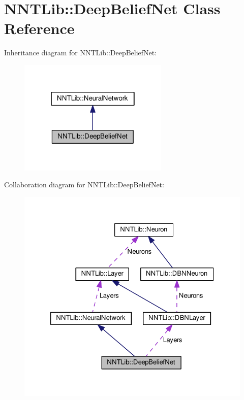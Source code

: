 \hypertarget{class_n_n_t_lib_1_1_deep_belief_net}{}\section{N\+N\+T\+Lib\+:\+:Deep\+Belief\+Net Class Reference}
\label{class_n_n_t_lib_1_1_deep_belief_net}


Inheritance diagram for N\+N\+T\+Lib\+:\+:Deep\+Belief\+Net\+:\nopagebreak
\begin{figure}[H]
\begin{center}
\leavevmode
\includegraphics[width=202pt]{class_n_n_t_lib_1_1_deep_belief_net__inherit__graph}
\end{center}
\end{figure}


Collaboration diagram for N\+N\+T\+Lib\+:\+:Deep\+Belief\+Net\+:\nopagebreak
\begin{figure}[H]
\begin{center}
\leavevmode
\includegraphics[width=326pt]{class_n_n_t_lib_1_1_deep_belief_net__coll__graph}
\end{center}
\end{figure}
